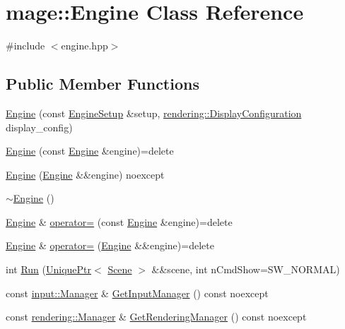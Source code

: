 \hypertarget{classmage_1_1_engine}{}\section{mage\+:\+:Engine Class Reference}
\label{classmage_1_1_engine}


{\ttfamily \#include $<$engine.\+hpp$>$}

\subsection*{Public Member Functions}
\begin{DoxyCompactItemize}
\item 
\hyperlink{classmage_1_1_engine_a0bc870c6e4f9418bcce548aa5ef6626b}{Engine} (const \hyperlink{classmage_1_1_engine_setup}{Engine\+Setup} \&setup, \hyperlink{classmage_1_1rendering_1_1_display_configuration}{rendering\+::\+Display\+Configuration} display\+\_\+config)
\item 
\hyperlink{classmage_1_1_engine_afd2f4f32b2e803f59521aafe1924f0ba}{Engine} (const \hyperlink{classmage_1_1_engine}{Engine} \&engine)=delete
\item 
\hyperlink{classmage_1_1_engine_a91a51a60109b49d6e322c299147e1312}{Engine} (\hyperlink{classmage_1_1_engine}{Engine} \&\&engine) noexcept
\item 
\hyperlink{classmage_1_1_engine_a34628556f8397d70ed018d71e343c2f5}{$\sim$\+Engine} ()
\item 
\hyperlink{classmage_1_1_engine}{Engine} \& \hyperlink{classmage_1_1_engine_a1eedff82d4c8207c61676230520648fd}{operator=} (const \hyperlink{classmage_1_1_engine}{Engine} \&engine)=delete
\item 
\hyperlink{classmage_1_1_engine}{Engine} \& \hyperlink{classmage_1_1_engine_a22607a263e0be5e179cc0e4bf13b18f7}{operator=} (\hyperlink{classmage_1_1_engine}{Engine} \&\&engine)=delete
\item 
int \hyperlink{classmage_1_1_engine_a4ad554bca1ac892e1274f2e707c2a017}{Run} (\hyperlink{namespacemage_a3316d7143a973e37adf1110f2e80ca31}{Unique\+Ptr}$<$ \hyperlink{classmage_1_1_scene}{Scene} $>$ \&\&scene, int n\+Cmd\+Show=S\+W\+\_\+\+N\+O\+R\+M\+AL)
\item 
const \hyperlink{classmage_1_1input_1_1_manager}{input\+::\+Manager} \& \hyperlink{classmage_1_1_engine_ae5b542540511190eb6d284bf3e6ab54c}{Get\+Input\+Manager} () const noexcept
\item 
const \hyperlink{classmage_1_1rendering_1_1_manager}{rendering\+::\+Manager} \& \hyperlink{classmage_1_1_engine_a9386c3aff5d7580ea39202e4dae967de}{Get\+Rendering\+Manager} () const noexcept

\end{DoxyCompactItemize}
